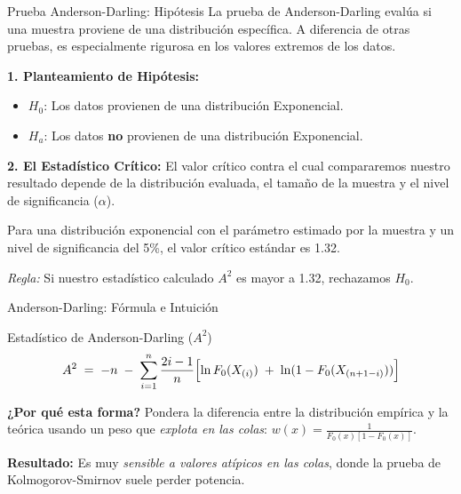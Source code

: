 \documentclass[aspectratio=1610, 10pt]{beamer}
\begin{document}
\begin{frame}{Prueba Anderson-Darling: Hipótesis}
La prueba de Anderson-Darling evalúa si una muestra proviene de una distribución específica. A diferencia de otras pruebas, es especialmente rigurosa en los valores extremos de los datos.

\vspace{0.3cm}
\textbf{1. Planteamiento de Hipótesis:}
\begin{itemize}
    \item $H_0$: Los datos provienen de una distribución Exponencial.
    \item $H_a$: Los datos \textbf{no} provienen de una distribución Exponencial.
\end{itemize}

\vspace{0.3cm}
\textbf{2. El Estadístico Crítico:}
El valor crítico contra el cual compararemos nuestro resultado depende de la distribución evaluada, el tamaño de la muestra y el nivel de significancia ($\alpha$). 


Para una distribución exponencial con el parámetro estimado por la muestra y un nivel de significancia del 5\%, el valor crítico estándar es 1.32.

\textit{Regla:} Si nuestro estadístico calculado $A^2$ es mayor a 1.32, rechazamos $H_0$.
\end{frame}

\begin{frame}{Anderson-Darling: Fórmula e Intuición}
\begin{block}{Estadístico de Anderson-Darling ($A^2$)}
  $$ A^2 \;=\; -n \;-\; \sum_{i=1}^{n} \frac{2i-1}{n} \Bigl[\ln F_0(X_{(i)}) \;+\; \ln(1-F_0(X_{(n+1-i)}))\Bigr] $$
\end{block}

\vspace{0.2cm}
\textbf{¿Por qué esta forma?}
Pondera la diferencia entre la distribución empírica y la teórica usando un peso que \emph{explota en las colas}: $w(x) = \frac{1}{F_0(x)[1-F_0(x)]}$.

\begin{center}
\end{center}


\small \textbf{Resultado:} Es muy \emph{sensible a valores atípicos en las colas}, donde la prueba de Kolmogorov-Smirnov suele perder potencia.
\end{frame}
\end{document}
